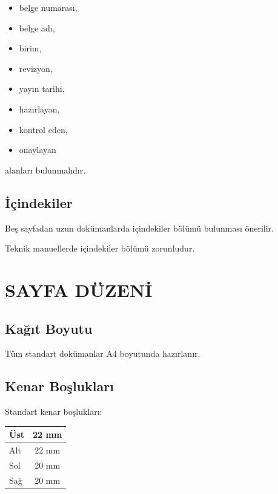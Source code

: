 \documentclass[11pt,a4paper]{article}
\begin{document}
\begin{itemize}
    \item belge numarası,
    \item belge adı,
    \item birim,
    \item revizyon,
    \item yayın tarihi,
    \item hazırlayan,
    \item kontrol eden,
    \item onaylayan
\end{itemize}

alanları bulunmalıdır.

\subsection{İçindekiler}

Beş sayfadan uzun dokümanlarda içindekiler bölümü bulunması önerilir.

Teknik manuellerde içindekiler bölümü zorunludur.


\newpage

\section{SAYFA DÜZENİ}

\subsection{Kağıt Boyutu}

Tüm standart dokümanlar A4 boyutunda hazırlanır.

\subsection{Kenar Boşlukları}

Standart kenar boşlukları:

\begin{center}

\begin{tabular}{|l|c|}
\hline
Üst & 22 mm \\
\hline
Alt & 22 mm \\
\hline
Sol & 20 mm \\
\hline
Sağ & 20 mm \\
\hline
\end{tabular}

\end{center}
\end{document}

